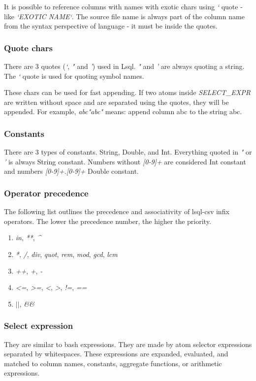 It is possible to reference columns with names with exotic chars using \textit{`} quote - like \textit{`EXOTIC NAME`}. The source file name is always part of the column name from the syntax perspective of language - it must be inside the quotes.

\subsubsection{Quote chars}
There are 3 quotes (\textit{`}, \textit{"} and \textit{'}) used in Lsql. \textit{"} and \textit{'} are always quoting a string. The \textit{`} quote is used for quoting symbol names.

These chars can be used for fast appending. If two atoms inside \textit{SELECT\_\-EXPR} are written without space and are separated using the quotes, they will be appended. For example, \textit{abc"abc"} means: append column abc to the string abc.

\subsubsection{Constants}
There are 3 types of constants. String, Double, and Int. Everything quoted in \textit{"} or \textit{'} is always String constant. Numbers without \textit{[0-9]+} are considered Int constant and numbers \textit{[0-9]+.[0-9]+} Double constant.

\subsubsection{Operator precedence}
The following list outlines the precedence and associativity of lsql-csv infix operators. The lower the precedence number, the higher the priority.

\begin{enumerate}
    \item \textit{in}, \textit{**}, \textit{\^}
    \item \textit{*}, \textit{/}, \textit{div}, \textit{quot}, \textit{rem}, \textit{mod}, \textit{gcd}, \textit{lcm}
    \item \textit{++}, \textit{+}, \textit{-}
    \item \textit{\textless=}, \textit{\textgreater=}, \textit{\textless}, \textit{\textgreater}, \textit{!=}, \textit{==}
    \item \textit{$\vert\vert$}, \textit{\&\&}
\end{enumerate}

\subsubsection{Select expression}
They are similar to bash expressions\cite{bash-reference-manual}. They are made by atom selector expressions separated by whitespaces. These expressions are expanded, evaluated, and matched to column names, constants, aggregate functions, or arithmetic expressions.

